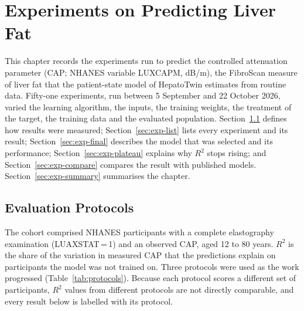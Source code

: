 \chapter{Experiments on Predicting Liver Fat}
\label{chap:cap-experiments}

This chapter records the experiments run to predict the controlled attenuation parameter (CAP; NHANES variable LUXCAPM, dB/m), the FibroScan measure of liver fat that the patient-state model of HepatoTwin estimates from routine data. Fifty-one experiments, run between 5 September and 22 October 2026, varied the learning algorithm, the inputs, the training weights, the treatment of the target, the training data and the evaluated population. Section~\ref{sec:exp-protocols} defines how results were measured; Section~\ref{sec:exp-list} lists every experiment and its result; Section~\ref{sec:exp-final} describes the model that was selected and its performance; Section~\ref{sec:exp-plateau} explains why $R^2$ stops rising; and Section~\ref{sec:exp-compare} compares the result with published models. Section~\ref{sec:exp-summary} summarises the chapter.

\section{Evaluation Protocols}
\label{sec:exp-protocols}

The cohort comprised NHANES participants with a complete elastography examination (LUAXSTAT\,=\,1) and an observed CAP, aged 12 to 80 years. $R^2$ is the share of the variation in measured CAP that the predictions explain on participants the model was not trained on. Three protocols were used as the work progressed (Table~\ref{tab:protocols}). Because each protocol scores a different set of participants, $R^2$ values from different protocols are not directly comparable, and every result below is labelled with its protocol.

